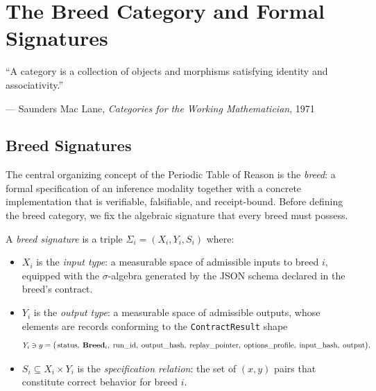 
\chapter{The Breed Category and Formal Signatures}
\label{chap:breed-category}
\label{chap:breed}

\epigraph{%
  ``A category is a collection of objects and morphisms satisfying identity and
  associativity.''
}{--- Saunders Mac Lane, \textit{Categories for the Working Mathematician}, 1971}

\section{Breed Signatures}
\label{sec:breed-signatures}

The central organizing concept of the Periodic Table of Reason is the
\emph{breed}: a formal specification of an inference modality together with a
concrete implementation that is verifiable, falsifiable, and receipt-bound.
Before defining the breed category, we fix the algebraic signature that every
breed must possess.

\begin{definition}
\label{def:breed-signature}
A \emph{breed signature} is a triple $\Sigma_i = (X_i, Y_i, S_i)$ where:
\begin{itemize}
  \item $X_i$ is the \emph{input type}: a measurable space of admissible inputs to
    breed $i$, equipped with the $\sigma$-algebra generated by the JSON schema
    declared in the breed's contract.
  \item $Y_i$ is the \emph{output type}: a measurable space of admissible outputs,
    whose elements are records conforming to the \texttt{ContractResult} shape
    \[
      Y_i \ni y = \bigl(\,\text{status},\; \mathbf{Breed}_i,\; \text{run\_id},\;
                         \text{output\_hash},\; \text{replay\_pointer},\;
                         \text{options\_profile},\; \text{input\_hash},\;
                         \text{output}\bigr).
    \]
  \item $S_i \subseteq X_i \times Y_i$ is the \emph{specification relation}:
    the set of $(x, y)$ pairs that constitute correct behavior for breed $i$.
\end{itemize}
\end{definition}

